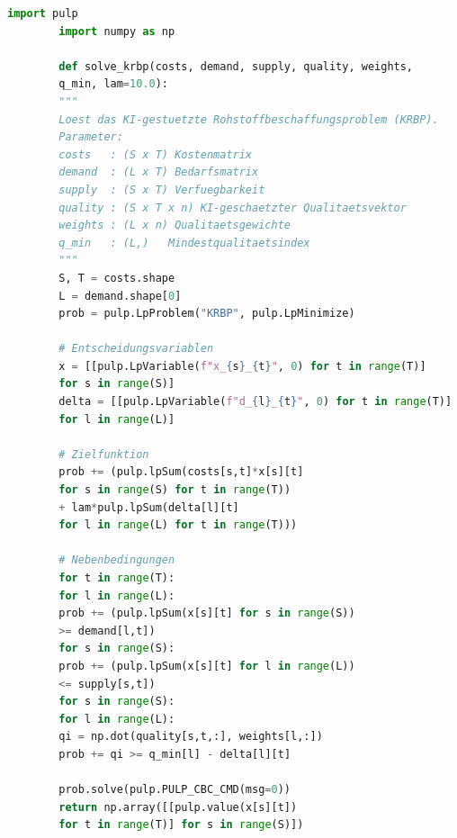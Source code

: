 ﻿\documentclass[12pt,a4paper]{article}
\theoremstyle{plain}
\theoremstyle{definition}
\begin{document}
	\begin{lstlisting}[language=Python, caption={Vereinfachter Python-Wrapper
			fÃ¼r den KRBP-MILP-Solver unter Verwendung von PuLP}]
		import pulp
		import numpy as np
		
		def solve_krbp(costs, demand, supply, quality, weights,
		q_min, lam=10.0):
		"""
		Loest das KI-gestuetzte Rohstoffbeschaffungsproblem (KRBP).
		Parameter:
		costs   : (S x T) Kostenmatrix
		demand  : (L x T) Bedarfsmatrix
		supply  : (S x T) Verfuegbarkeit
		quality : (S x T x n) KI-geschaetzter Qualitaetsvektor
		weights : (L x n) Qualitaetsgewichte
		q_min   : (L,)   Mindestqualitaetsindex
		"""
		S, T = costs.shape
		L = demand.shape[0]
		prob = pulp.LpProblem("KRBP", pulp.LpMinimize)
		
		# Entscheidungsvariablen
		x = [[pulp.LpVariable(f"x_{s}_{t}", 0) for t in range(T)]
		for s in range(S)]
		delta = [[pulp.LpVariable(f"d_{l}_{t}", 0) for t in range(T)]
		for l in range(L)]
		
		# Zielfunktion
		prob += (pulp.lpSum(costs[s,t]*x[s][t]
		for s in range(S) for t in range(T))
		+ lam*pulp.lpSum(delta[l][t]
		for l in range(L) for t in range(T)))
		
		# Nebenbedingungen
		for t in range(T):
		for l in range(L):
		prob += (pulp.lpSum(x[s][t] for s in range(S))
		>= demand[l,t])
		for s in range(S):
		prob += (pulp.lpSum(x[s][t] for l in range(L))
		<= supply[s,t])
		for s in range(S):
		for l in range(L):
		qi = np.dot(quality[s,t,:], weights[l,:])
		prob += qi >= q_min[l] - delta[l][t]
		
		prob.solve(pulp.PULP_CBC_CMD(msg=0))
		return np.array([[pulp.value(x[s][t])
		for t in range(T)] for s in range(S)])
	\end{lstlisting}
	
\end{document}
